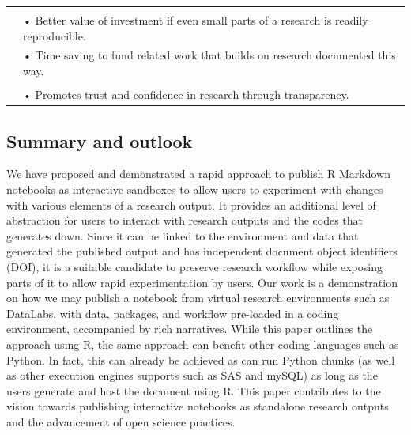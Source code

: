 \begin{Schunk}
\begin{table}
\begin{tabular}[t]{>{\raggedright\arraybackslash}p{0.1em}>{\raggedright\arraybackslash}p{40em}}
\midrule
\addlinespace[0.3em]
\multicolumn{2}{l}{\textbf{Funders}}\\
\hspace{1em} & • Better value of investment if even small parts of a research is readily reproducible.\\
\hspace{1em} & • Time saving to fund related work that builds on research documented this way.\\
\midrule
\addlinespace[0.3em]
\multicolumn{2}{l}{\textbf{Wider research community and general public}}\\
\hspace{1em} & • Promotes trust and confidence in research through transparency.\\
\bottomrule
\end{tabular}
\end{table}

\end{Schunk}

\hypertarget{summary-and-outlook}{%
\subsection{Summary and outlook}\label{summary-and-outlook}}

We have proposed and demonstrated a rapid approach to publish R Markdown
notebooks as interactive sandboxes to allow users to experiment with
changes with various elements of a research output. It provides an
additional level of abstraction for users to interact with research
outputs and the codes that generates down. Since it can be linked to the
environment and data that generated the published output and has
independent document object identifiers (DOI), it is a suitable
candidate to preserve research workflow while exposing parts of it to
allow rapid experimentation by users. Our work is a demonstration on how
we may publish a notebook from virtual research environments such as
DataLabs, with data, packages, and workflow pre-loaded in a coding
environment, accompanied by rich narratives. While this paper outlines
the approach using R, the same approach can benefit other coding
languages such as Python. In fact, this can already be achieved as
 can run Python chunks (as well as other execution engines
 supports such as SAS and mySQL) as long as the users
generate and host the document using R. This paper contributes to the
vision towards publishing interactive notebooks as standalone research
outputs and the advancement of open science practices.

